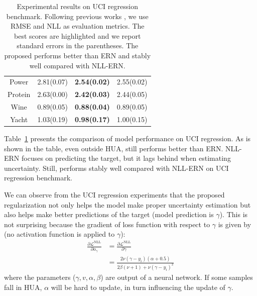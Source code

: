 \begin{table}
{\begin{tabular}{@{}cccc@{}}
Power                     & 2.81(0.07)          & \textbf{2.54(0.02)} & 2.55(0.02)           \\
Protein                   & 2.63(0.00)          & \textbf{2.42(0.03)}          & 2.44(0.05)  \\
Wine                      & 0.89(0.05)          & \textbf{0.88(0.04)} & 0.89(0.05)           \\
Yacht                     & 1.03(0.19)          & \textbf{0.98(0.17)} & 1.00(0.15)           \\ \bottomrule
\end{tabular}%
}
\caption{Experimental results on UCI regression benchmark. Following previous works \cite{NEURIPS2020_aab08546,oh2022improving}, we use RMSE and NLL as evaluation metrics.
The best scores are highlighted and we report standard errors in the parentheses. The proposed \ours performs better than ERN and stably well compared with NLL-ERN.
}
\label{tab:UCI}
\end{table}

Table~\ref{tab:UCI} presents the comparison of model performance on UCI regression. As is shown in the table, even outside HUA, \ours still performs better than ERN. NLL-ERN focuses on predicting the target, but it lags behind when estimating uncertainty. Still, \ours performs stably well compared with NLL-ERN on UCI regression benchmark.

We can observe from the UCI regression experiments that the proposed regularization not only helps the model make proper uncertainty estimation but also helps make better predictions of the target (model prediction is $\gamma$). This is not surprising because the gradient of loss function with respect to $\gamma$ is given by (no activation function is applied to $\gamma$):
\begin{equation}
\begin{aligned}
\frac{\partial \mathcal{L}^{\mathrm{NLL}}}{\partial o_\gamma} &=\frac{\partial \mathcal{L}^{\mathrm{NLL}}}{\partial \gamma}  \\
&=\frac{2 \nu\left(\gamma-y_i\right)(\alpha+0.5)}{2 \beta(\nu+1)+\nu\left(\gamma-y_i\right)^2} 
\end{aligned}
\end{equation}
where the parameters ($\gamma, v, \alpha, \beta$) are output of a neural network. If some samples fall in HUA, $\alpha$ will be hard to update, in turn influencing the update of $\gamma$.

